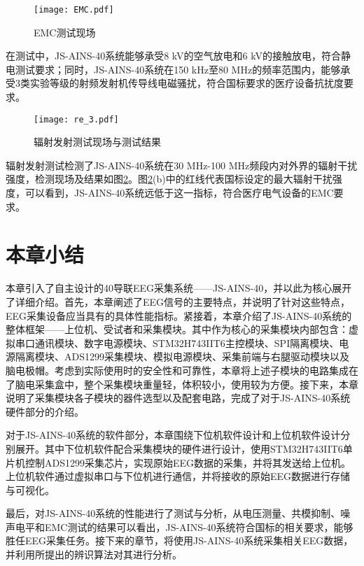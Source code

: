 \begin{figure}[!h]
	\centering
	\texttt{[image: EMC.pdf]}
	\caption{EMC测试现场} 
	\label{fig2-25}
\end{figure}

在测试中，JS-AINS-40系统能够承受8 kV的空气放电和6 kV的接触放电，符合静电测试要求；同时，JS-AINS-40系统在150 kHz至80 MHz的频率范围内，能够承受3类实验等级的射频发射机传导线电磁骚扰，符合国标要求的医疗设备抗扰度要求。


\begin{figure}[!h]
	\centering
	\texttt{[image: re\_3.pdf]}
	\caption{辐射发射测试现场与测试结果} 
	\label{fig2-26}
\end{figure}

辐射发射测试检测了JS-AINS-40系统在30 MHz-100 MHz频段内对外界的辐射干扰强度，检测现场及结果如图\ref{fig2-26}。图\ref{fig2-26}(b)中的红线代表国标设定的最大辐射干扰强度，可以看到，JS-AINS-40系统远低于这一指标，符合医疗电气设备的EMC要求。


\section{本章小结}
本章引入了自主设计的40导联EEG采集系统——JS-AINS-40，并以此为核心展开了详细介绍。首先，本章阐述了EEG信号的主要特点，并说明了针对这些特点，EEG采集设备应当具有的具体性能指标。紧接着，本章介绍了JS-AINS-40系统的整体框架——上位机、受试者和采集模块。其中作为核心的采集模块内部包含：虚拟串口通讯模块、数字电源模块、STM32H743IIT6主控模块、SPI隔离模块、电源隔离模块、ADS1299采集模块、模拟电源模块、采集前端与右腿驱动模块以及脑电极帽。考虑到实际使用时的安全性和可靠性，本章将上述子模块的电路集成在了脑电采集盒中，整个采集模块重量轻，体积较小，使用较为方便。接下来，本章说明了采集模块各子模块的器件选型以及配套电路，完成了对于JS-AINS-40系统硬件部分的介绍。

对于JS-AINS-40系统的软件部分，本章围绕下位机软件设计和上位机软件设计分别展开。其中下位机软件配合采集模块的硬件进行设计，使用STM32H743IIT6单片机控制ADS1299采集芯片，实现原始EEG数据的采集，并将其发送给上位机。上位机软件通过虚拟串口与下位机进行通信，并将接收的原始EEG数据进行存储与可视化。

最后，对JS-AINS-40系统的性能进行了测试与分析，从电压测量、共模抑制、噪声电平和EMC测试的结果可以看出，JS-AINS-40系统符合国标的相关要求，能够胜任EEG采集任务。接下来的章节，将使用JS-AINS-40系统采集相关EEG数据，并利用所提出的辨识算法对其进行分析。





